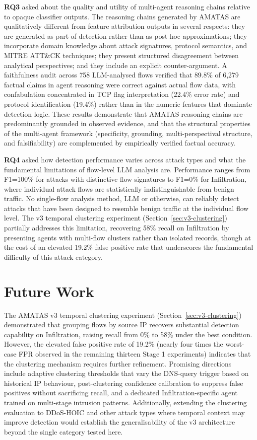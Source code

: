 \documentclass[../main.tex]{subfiles}
\begin{document}
\textbf{RQ3} asked about the quality and utility of multi-agent reasoning chains relative to opaque classifier outputs. The reasoning chains generated by AMATAS are qualitatively different from feature attribution outputs in several respects: they are generated as part of detection rather than as post-hoc approximations; they incorporate domain knowledge about attack signatures, protocol semantics, and MITRE ATT\&CK techniques; they present structured disagreement between analytical perspectives; and they include an explicit counter-argument. A faithfulness audit across 758 LLM-analysed flows verified that 89.8\% of 6{,}279 factual claims in agent reasoning were correct against actual flow data, with confabulation concentrated in TCP flag interpretation (22.4\% error rate) and protocol identification (19.4\%) rather than in the numeric features that dominate detection logic. These results demonstrate that AMATAS reasoning chains are predominantly grounded in observed evidence, and that the structural properties of the multi-agent framework (specificity, grounding, multi-perspectival structure, and falsifiability) are complemented by empirically verified factual accuracy.

\textbf{RQ4} asked how detection performance varies across attack types and what the fundamental limitations of flow-level LLM analysis are. Performance ranges from F1=100\% for attacks with distinctive flow signatures to F1=0\% for Infiltration, where individual attack flows are statistically indistinguishable from benign traffic. No single-flow analysis method, LLM or otherwise, can reliably detect attacks that have been designed to resemble benign traffic at the individual flow level. The v3 temporal clustering experiment (Section~\ref{sec:v3-clustering}) partially addresses this limitation, recovering 58\% recall on Infiltration by presenting agents with multi-flow clusters rather than isolated records, though at the cost of an elevated 19.2\% false positive rate that underscores the fundamental difficulty of this attack category.

\section{Future Work}
\label{sec:future}

The AMATAS v3 temporal clustering experiment (Section~\ref{sec:v3-clustering}) demonstrated that grouping flows by source IP recovers substantial detection capability on Infiltration, raising recall from 0\% to 58\% under the best condition. However, the elevated false positive rate of 19.2\% (nearly four times the worst-case FPR observed in the remaining thirteen Stage 1 experiments) indicates that the clustering mechanism requires further refinement. Promising directions include adaptive clustering thresholds that vary the DNS-query trigger based on historical IP behaviour, post-clustering confidence calibration to suppress false positives without sacrificing recall, and a dedicated Infiltration-specific agent trained on multi-stage intrusion patterns. Additionally, extending the clustering evaluation to DDoS-HOIC and other attack types where temporal context may improve detection would establish the generalisability of the v3 architecture beyond the single category tested here.
\end{document}
